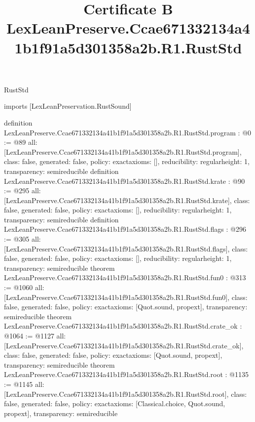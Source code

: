 \begin{lexlean}{RustStd}
\title{Certificate B LexLeanPreserve.Ccae671332134a41b1f91a5d301358a2b.R1.RustStd}
\begin{coremodule}
imports [LexLeanPreservation.RustSound]

definition LexLeanPreserve.Ccae671332134a41b1f91a5d301358a2b.R1.RustStd.program : @0 := @89 {
  all: [LexLeanPreserve.Ccae671332134a41b1f91a5d301358a2b.R1.RustStd.program],
  class: false,
  generated: false,
  policy: exact{axioms: []},
  reducibility: regular{height: 1},
  transparency: semireducible
}
definition LexLeanPreserve.Ccae671332134a41b1f91a5d301358a2b.R1.RustStd.krate : @90 := @295 {
  all: [LexLeanPreserve.Ccae671332134a41b1f91a5d301358a2b.R1.RustStd.krate],
  class: false,
  generated: false,
  policy: exact{axioms: []},
  reducibility: regular{height: 1},
  transparency: semireducible
}
definition LexLeanPreserve.Ccae671332134a41b1f91a5d301358a2b.R1.RustStd.flags : @296 := @305 {
  all: [LexLeanPreserve.Ccae671332134a41b1f91a5d301358a2b.R1.RustStd.flags],
  class: false,
  generated: false,
  policy: exact{axioms: []},
  reducibility: regular{height: 1},
  transparency: semireducible
}
theorem LexLeanPreserve.Ccae671332134a41b1f91a5d301358a2b.R1.RustStd.fun0 : @313 := @1060 {
  all: [LexLeanPreserve.Ccae671332134a41b1f91a5d301358a2b.R1.RustStd.fun0],
  class: false,
  generated: false,
  policy: exact{axioms: [Quot.sound, propext]},
  transparency: semireducible
}
theorem LexLeanPreserve.Ccae671332134a41b1f91a5d301358a2b.R1.RustStd.crate_ok : @1064 := @1127 {
  all: [LexLeanPreserve.Ccae671332134a41b1f91a5d301358a2b.R1.RustStd.crate_ok],
  class: false,
  generated: false,
  policy: exact{axioms: [Quot.sound, propext]},
  transparency: semireducible
}
theorem LexLeanPreserve.Ccae671332134a41b1f91a5d301358a2b.R1.RustStd.root : @1135 := @1145 {
  all: [LexLeanPreserve.Ccae671332134a41b1f91a5d301358a2b.R1.RustStd.root],
  class: false,
  generated: false,
  policy: exact{axioms: [Classical.choice, Quot.sound, propext]},
  transparency: semireducible
}


\end{coremodule}
\end{lexlean}
